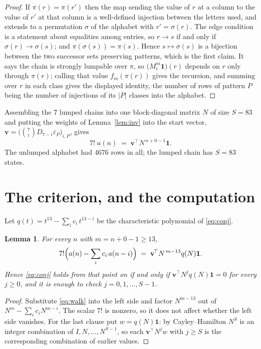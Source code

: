 \documentclass[11pt,a4paper]{article}
\theoremstyle{plain}
\newtheorem{lemma}[theorem]{Lemma}
\theoremstyle{definition}
\begin{document}
\begin{proof}
If $\pi(r)=\pi(r')$ then the map sending the value of $r$ at a column to the value of $r'$
at that column is a well-defined injection between the letters used, and extends to a
permutation $\sigma$ of the alphabet with $r'=\sigma(r)$. The edge condition is a statement
about equalities among entries, so $r\to s$ if and only if $\sigma(r)\to\sigma(s)$; and
$\pi(\sigma(s))=\pi(s)$. Hence $s\mapsto\sigma(s)$ is a bijection between the two successor
sets preserving patterns, which is the first claim. It says the chain is strongly lumpable
over $\pi$, so $\bigl(M_i^{m}\mathbf{1}\bigr)(r)$ depends on $r$ only through $\pi(r)$;
calling that value $f_m(\pi(r))$ gives the recursion, and summing over $r$ in each class
gives the displayed identity, the number of rows of pattern $P$ being the number of
injections of its $|P|$ classes into the alphabet.
\end{proof}

Assembling the $7$ lumped chains into one block-diagonal matrix $N$ of size $S=83$ and
putting the weights of Lemma~\ref{lem:inv} into the start vector,
$\mathbf{v}=\bigl(\binom{7}{i}D_{7-i}\varepsilon_P\bigr)_{i,P}$, gives
\begin{equation}\label{eq:walk}
7!\;a(n)\;=\;\mathbf{v}^{\!\top}N^{\,n+0-1}\mathbf{1} .
\end{equation}
The unlumped alphabet had $4676$ rows in all; the lumped chain has $S=83$ states.

\section{The criterion, and the computation}

Let $q(t)=t^{13}-\sum_i c_i\,t^{13-i}$ be the characteristic polynomial of
\eqref{eq:conj}.

\begin{lemma}\label{lem:crit}
For every $n$ with $m=n+0-1\ge13$,
\[
7!\Bigl(a(n)-\sum_i c_i\,a(n-i)\Bigr)\;=\;\mathbf{v}^{\!\top}N^{\,m-13}q(N)\mathbf{1} .
\]
Hence \eqref{eq:conj} holds from that point on if and only if
$\mathbf{v}^{\!\top}N^{j}q(N)\mathbf{1}=0$ for every $j\ge0$, and it is enough to check
$j=0,1,\dots,S-1$.
\end{lemma}

\begin{proof}
Substitute \eqref{eq:walk} into the left side and factor $N^{m-13}$ out of
$N^{m}-\sum_i c_iN^{m-i}$. The scalar $7!$ is nonzero, so it does not affect whether
the left side vanishes. For the last clause put $w=q(N)\mathbf{1}$: by Cayley--Hamilton
$N^{S}$ is an integer combination of $I,N,\dots,N^{S-1}$, so each
$\mathbf{v}^{\!\top}N^{j}w$ with $j\ge S$ is the corresponding combination of earlier
values.
\end{proof}
\end{document}
